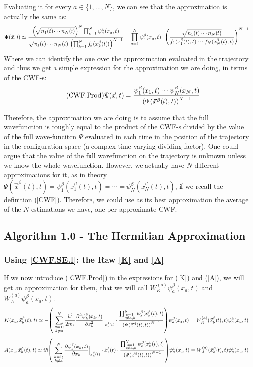 \documentclass[11pt, a4paper]{article} %
\newcommand{\s}{\mathbb{S}}
\begin{document}
Evaluating it for every $a\in \{1,...,N\}$, we can see that the approximation is actually the same as:
$$
\Psi(\vec{x}, t)\simeq \frac{ \qty(\sqrt{n_1(t)\cdots n_N(t)})^N\prod_{a=1}^N \psi_a^\beta(x_a,t)}{\sqrt{n_1(t)\cdots n_N(t)}\ \qty(\prod_{\substack{k=1}}^{N} f_k(x_k^\beta(t)))^{N-1}} = \prod_{a=1}^N \psi_a^\beta(x_a,t) \cdot \qty(\frac{\sqrt{n_1(t)\cdots n_N(t)}}{f_1(x_1^\beta(t),t)\cdots f_N(x_N^\beta(t),t)})^{N-1}
$$
Where we can identify the one over the approximation evaluated in the trajectory and thus we get a simple expression for the approximation we are doing, in terms of the CWF-s:
\begin{equation}\label{CWF.Prod}\tag{CWF.Prod}
\Psi(\vec{x},t)= \frac{\psi_1^\beta(x_1,t)\cdots \psi_N^\beta(x_N,t)}{\qty(\Psi(\vec{x}^\beta(t),t))^{N-1}}
\end{equation}

Therefore, the approximation we are doing is to assume that the full wavefunction is roughly equal to the product of the CWF-s divided by the value of the full wave-funciton $\Psi$ evaluated in each time in the position of the trajectory in the configuration space (a complex time varying dividing factor). One could argue that the value of the full wavefunction on the trajectory is unknown unless we know the whole wavefunction. However, we actually have $N$ different approximations for it, as in theory $\Psi(\vec{x}^\beta(t),t)=\psi^\beta_1(x_1^\beta(t),t)=\cdots=\psi^\beta_N(x_N^\beta(t),t)$, if we recall the definition (\ref{CWF}). Therefore, we could use as its best approximation the average of the $N$ estimations we have, one per approximate CWF.

\subsection{Algorithm 1.0 - The Hermitian Approximation}
\subsubsection{Using \ref{CWF.SE.I}: the Raw \ref{K} and \ref{A}}

If we now introduce (\ref{CWF.Prod}) in the expressions for (\ref{K}) and (\ref{A}), we will get an approximation for them, that we will call $W^{(a)}_K\psi_a^\beta(x_a,t)$ and $W^{(a)}_A\psi_a^\beta(x_a,t)$:
$$
K(x_a, \vec{x}_b^\beta(t), t) \simeq - \qty(\ \sum_{\substack{k=1; \\ k\neq a}}^{N} \frac{\hbar^2}{2m_k}\pdv[2]{\psi_k^\beta(x_k,t)}{x_k}\Big\rvert_{x_k^\beta(t)}\cdot\frac{\prod_{\substack{s=1\\s\neq a,k}}^{N} \psi_s^\beta(x_s^\beta(t),t) }{\qty(\Psi(\vec{x}^\beta(t),t))^{N-1}} )\psi_a^\beta(x_a,t) = W^{(a)}_K(\vec{x}_b^\beta (t),t)\psi_a^\beta(x_a,t)
$$
$$
A(x_a, \vec{x}_b^\beta(t), t) \simeq i\hbar \qty(\ \sum_{\substack{k=1; \\ k\neq a}}^{N} \pdv{\psi_k^\beta(x_k,t)}{x_k}\Big\rvert_{x_k^\beta(t)}\cdot \dot{x}_k^\beta(t) \cdot\frac{\prod_{\substack{s=1\\s\neq a,k}}^{N} \psi_s^\beta(x_s^\beta(t),t) }{\qty(\Psi(\vec{x}^\beta(t),t))^{N-1}} )\psi_a^\beta(x_a,t) = W^{(a)}_A(\vec{x}_b^\beta (t),t)\psi_a^\beta(x_a,t)
$$
\end{document}
